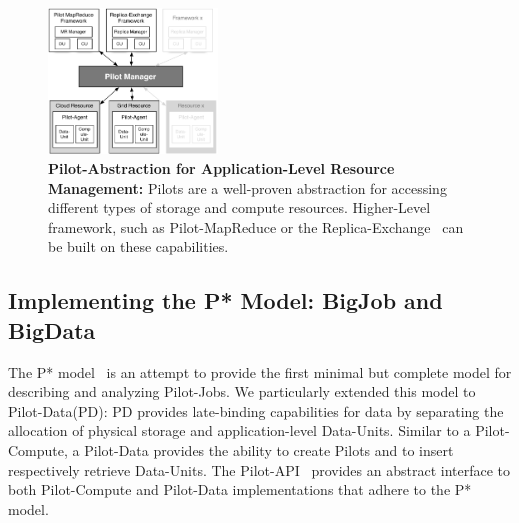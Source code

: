 \documentclass[times]{cpeauth}
\newcommand{\jhanote}[1]{ {\textcolor{red} { ***shantenu: #1 }}}
\newcommand{\alnote}[1]{ {\textcolor{green} { ***andreL: #1 }}}
\newcommand{\alnote}[1]{}
\newcommand{\jhanote}[1]{}
\newcommand{\pilots}{Pilots\xspace}
\newcommand{\pilotjobs}{Pilot-Jobs\xspace}
\newcommand{\pilotcompute}{Pilot-Compute\xspace}
\newcommand{\pilotdata}{Pilot-Data\xspace}
\newcommand{\dataunits}{Data-Units\xspace}
\newcommand{\cus}{CUs\xspace}
\newcommand{\upp}{\vspace*{-0.5em}}
\begin{document}
\begin{figure}
	\upp\upp
	\centering
		\includegraphics[width=0.4\textwidth]{figures/pilot-abstractions.pdf}
	\caption{\textbf{Pilot-Abstraction for Application-Level Resource 
	Management:}  \pilots are a well-proven abstraction for accessing 
	different types of storage and compute resources. Higher-Level framework, 
	such as Pilot-MapReduce or the Replica-Exchange~\cite{async_repex11} 
	can be built on these capabilities.}
	\label{fig:figures_pilot-abstractions}
\end{figure}






\subsection{Implementing the P* Model: BigJob and BigData}

The P* model~\cite{pstar12} is an attempt to provide the first minimal
but complete model for describing and analyzing \pilotjobs. We
particularly extended this model to \pilotdata (PD): PD provides
late-binding capabilities for data by separating the allocation of
physical storage and application-level \dataunits.  Similar to a
\pilotcompute, a \pilotdata provides the ability to create \pilots and
to insert respectively retrieve \dataunits. The
Pilot-API~\cite{pilot_api} provides an abstract interface to both
\pilotcompute and \pilotdata implementations that adhere to the P*
model.
\end{document}
